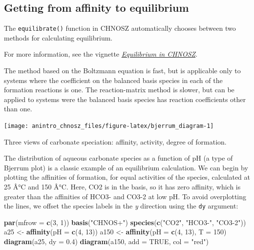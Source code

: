\documentclass[]{tufte-handout}
\newenvironment{Shaded}{}{}
\newcommand{\KeywordTok}[1]{\textcolor[rgb]{0.00,0.44,0.13}{\textbf{#1}}}
\newcommand{\DataTypeTok}[1]{\textcolor[rgb]{0.56,0.13,0.00}{#1}}
\newcommand{\DecValTok}[1]{\textcolor[rgb]{0.25,0.63,0.44}{#1}}
\newcommand{\FloatTok}[1]{\textcolor[rgb]{0.25,0.63,0.44}{#1}}
\newcommand{\StringTok}[1]{\textcolor[rgb]{0.25,0.44,0.63}{#1}}
\newcommand{\OtherTok}[1]{\textcolor[rgb]{0.00,0.44,0.13}{#1}}
\newcommand{\NormalTok}[1]{#1}
\begin{document}
\subsection{Getting from affinity to
equilibrium}\label{getting-from-affinity-to-equilibrium}

The {\texttt{equilibrate()}} function in CHNOSZ automatically chooses
between two methods for calculating equilibrium.

\begin{marginfigure}
For more information, see the vignette
\href{equilibrium.pdf}{{\emph{Equilibrium in CHNOSZ}}}.
\end{marginfigure}

The method based on the Boltzmann equation is fast, but is applicable
only to systems where the coefficient on the balanced basis species in
each of the formation reactions is one. The reaction-matrix method is
slower, but can be applied to systems were the balanced basis species
has reaction coefficients other than one.

\begin{marginfigure}
\texttt{[image: anintro\_chnosz\_files/figure-latex/bjerrum\_diagram-1]} \caption[Three views of carbonate speciation]{Three views of carbonate speciation: affinity, activity, degree of formation.}\label{fig:bjerrum_diagram}
\end{marginfigure}

The distribution of aqueous carbonate species as a function of pH (a
type of Bjerrum plot) is a classic example of an equilibrium
calculation. We can begin by plotting the affinities of formation, for
equal activities of the species, calculated at 25 Â°C and 150 Â°C. Here,
CO2 is in the basis, so it has zero affinity, which is greater than the
affinities of HCO3- and CO3-2 at low pH. To avoid overplotting the
lines, we offset the species labels in the \emph{y} direction using the
\texttt{dy} argument:

\begin{Shaded}
\begin{Highlighting}[]
\KeywordTok{par}\NormalTok{(}\DataTypeTok{mfrow =} \KeywordTok{c}\NormalTok{(}\DecValTok{3}\NormalTok{, }\DecValTok{1}\NormalTok{))}
\KeywordTok{basis}\NormalTok{(}\StringTok{"CHNOS+"}\NormalTok{)}
\KeywordTok{species}\NormalTok{(}\KeywordTok{c}\NormalTok{(}\StringTok{"CO2"}\NormalTok{, }\StringTok{"HCO3-"}\NormalTok{, }\StringTok{"CO3-2"}\NormalTok{))}
\NormalTok{a25 <-}\StringTok{ }\KeywordTok{affinity}\NormalTok{(}\DataTypeTok{pH =} \KeywordTok{c}\NormalTok{(}\DecValTok{4}\NormalTok{, }\DecValTok{13}\NormalTok{))}
\NormalTok{a150 <-}\StringTok{ }\KeywordTok{affinity}\NormalTok{(}\DataTypeTok{pH =} \KeywordTok{c}\NormalTok{(}\DecValTok{4}\NormalTok{, }\DecValTok{13}\NormalTok{), }\DataTypeTok{T =} \DecValTok{150}\NormalTok{)}
\KeywordTok{diagram}\NormalTok{(a25, }\DataTypeTok{dy =} \FloatTok{0.4}\NormalTok{)}
\KeywordTok{diagram}\NormalTok{(a150, }\DataTypeTok{add =} \OtherTok{TRUE}\NormalTok{, }\DataTypeTok{col =} \StringTok{"red"}\NormalTok{)}
\end{Highlighting}
\end{Shaded}
\end{document}
